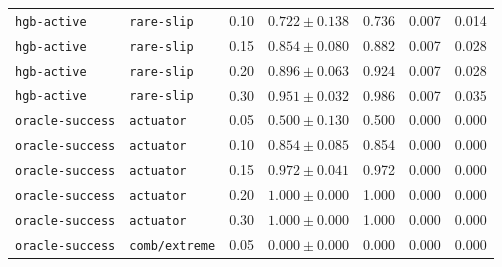 \documentclass{article}
\begin{document}
\begin{center}
\begin{tabular}{lllcccc}
\texttt{hgb-active} & \texttt{rare-slip} & 0.10 & $0.722 \pm 0.138$ & 0.736 & 0.007 & 0.014 \\
\texttt{hgb-active} & \texttt{rare-slip} & 0.15 & $0.854 \pm 0.080$ & 0.882 & 0.007 & 0.028 \\
\texttt{hgb-active} & \texttt{rare-slip} & 0.20 & $0.896 \pm 0.063$ & 0.924 & 0.007 & 0.028 \\
\texttt{hgb-active} & \texttt{rare-slip} & 0.30 & $0.951 \pm 0.032$ & 0.986 & 0.007 & 0.035 \\
\texttt{oracle-success} & \texttt{actuator} & 0.05 & $0.500 \pm 0.130$ & 0.500 & 0.000 & 0.000 \\
\texttt{oracle-success} & \texttt{actuator} & 0.10 & $0.854 \pm 0.085$ & 0.854 & 0.000 & 0.000 \\
\texttt{oracle-success} & \texttt{actuator} & 0.15 & $0.972 \pm 0.041$ & 0.972 & 0.000 & 0.000 \\
\texttt{oracle-success} & \texttt{actuator} & 0.20 & $1.000 \pm 0.000$ & 1.000 & 0.000 & 0.000 \\
\texttt{oracle-success} & \texttt{actuator} & 0.30 & $1.000 \pm 0.000$ & 1.000 & 0.000 & 0.000 \\
\texttt{oracle-success} & \texttt{comb/extreme} & 0.05 & $0.000 \pm 0.000$ & 0.000 & 0.000 & 0.000 \\
\bottomrule
\end{tabular}
\end{center}
\end{document}

